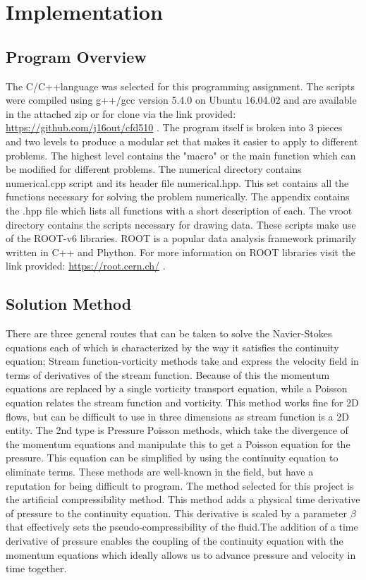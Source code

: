 \documentclass[paper=a4, fontsize=11pt, abstract=on]{scrartcl}
\numberwithin{equation}{section}		%
\numberwithin{figure}{section}			%
\numberwithin{table}{section}				%
\begin{document}
\section{Implementation}
\subsection{Program Overview}
The C/C++language was selected for this programming assignment. The scripts were compiled using g++/gcc version 5.4.0 on Ubuntu 16.04.02 and are available in the attached zip or for clone via the link provided: \url{https://github.com/j16out/cfd510} . The program itself is broken into 3 pieces and two levels to produce a modular set that makes it easier to apply to different problems. The highest level contains the "macro" or the main function which can be modified for different problems. 
The numerical directory contains numerical.cpp script and its header file numerical.hpp. This set contains all the functions necessary for solving the problem numerically. The appendix contains the .hpp file which lists all functions with a short description of each. The vroot directory contains the scripts necessary for drawing data. These scripts make use of the ROOT-v6 libraries. ROOT is a popular data analysis framework primarily written in C++ and Phython. For more information on ROOT libraries visit the link provided: \url{https://root.cern.ch/} .

 
\subsection{Solution Method}
There are three general routes that can be taken to solve the Navier-Stokes equations each of which is characterized by the way it satisfies the continuity equation; Stream function-vorticity methods take and express the velocity field in terms of derivatives of the stream function. Because of this the momentum equations are replaced by a single vorticity transport equation, while a Poisson equation relates the stream function and vorticity.  This method works fine for 2D flows, but can be difficult to use in three dimensions as stream function is a 2D entity. The 2nd type is Pressure Poisson methods, which take the divergence of the momentum equations and manipulate this to get a Poisson equation for the pressure. This equation can be simplified by using the continuity equation to eliminate terms. These methods are well-known in the field, but have a reputation for being difficult to program. The method selected for this project is the artificial compressibility method. This method adds a physical time derivative of pressure to the continuity equation. This derivative is scaled by a parameter $\beta$ that effectively sets the pseudo-compressibility of the fluid.The addition of a
time derivative of pressure enables the coupling of the continuity equation with the
momentum equations which ideally allows us to advance pressure and velocity in time
together.
\end{document}

